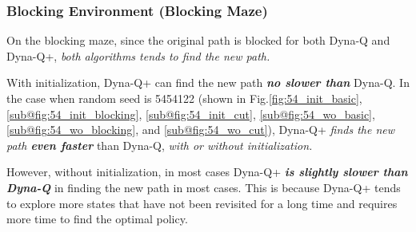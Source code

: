 \documentclass{article}
\begin{document}
    \vspace{1em} 
    \subsubsection{Blocking Environment (Blocking Maze)}

    \hspace{2em}
    On the blocking maze, since the original path is blocked for both Dyna-Q and Dyna-Q+, \emph{both algorithms tends to find the new path.} 
    
    \hspace{0.7em}
    With initialization, Dyna-Q+ can find the new path \emph{\textbf{no slower than}} Dyna-Q. In the case when random seed is 5454122 (shown in Fig.\ref{fig:54_init_basic}, \ref{sub@fig:54_init_blocking}, \ref{sub@fig:54_init_cut}, \ref{sub@fig:54_wo_basic}, \ref{sub@fig:54_wo_blocking}, and \ref{sub@fig:54_wo_cut}), Dyna-Q+ \emph{finds the new path \textbf{even faster}} than Dyna-Q, \emph{with or without initialization.}
    
    \hspace{0.7em}
    However, without initialization, in most cases Dyna-Q+ \textbf{\emph{is slightly slower than Dyna-Q}} in finding the new path in most cases. This is because Dyna-Q+ tends to explore more states that have not been revisited for a long time and requires more time to find the optimal policy.
\end{document}
